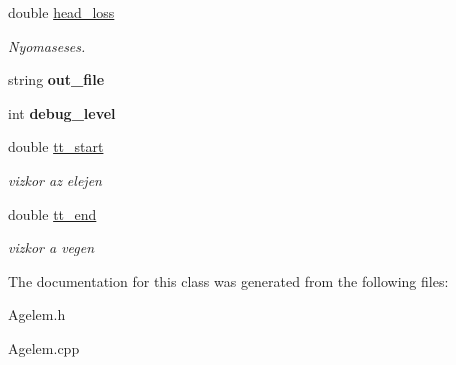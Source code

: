 \begin{DoxyCompactItemize}
\mbox{\label{class_agelem_a723a132d3fc5ce069b16f22d169d9772}} 
double \hyperlink{class_agelem_a723a132d3fc5ce069b16f22d169d9772}{head\+\_\+loss}
\begin{DoxyCompactList}\small\item\em Nyomaseses. \end{DoxyCompactList}\item 
\mbox{\label{class_agelem_a79b5d0684f173c6cbd98530583352211}} 
string {\bfseries out\+\_\+file}
\item 
\mbox{\label{class_agelem_a18e84a58b3a1f45465e27e1afdf2f2a1}} 
int {\bfseries debug\+\_\+level}
\item 
\mbox{\label{class_agelem_a09ea41e75493961eb2b1d755c74e95f6}} 
double \hyperlink{class_agelem_a09ea41e75493961eb2b1d755c74e95f6}{tt\+\_\+start}
\begin{DoxyCompactList}\small\item\em vizkor az elejen \end{DoxyCompactList}\item 
\mbox{\label{class_agelem_af07d516eda5f43a676f9f417436e0d9c}} 
double \hyperlink{class_agelem_af07d516eda5f43a676f9f417436e0d9c}{tt\+\_\+end}
\begin{DoxyCompactList}\small\item\em vizkor a vegen \end{DoxyCompactList}\end{DoxyCompactItemize}


The documentation for this class was generated from the following files\+:\begin{DoxyCompactItemize}
\item 
Agelem.\+h\item 
Agelem.\+cpp\end{DoxyCompactItemize}
